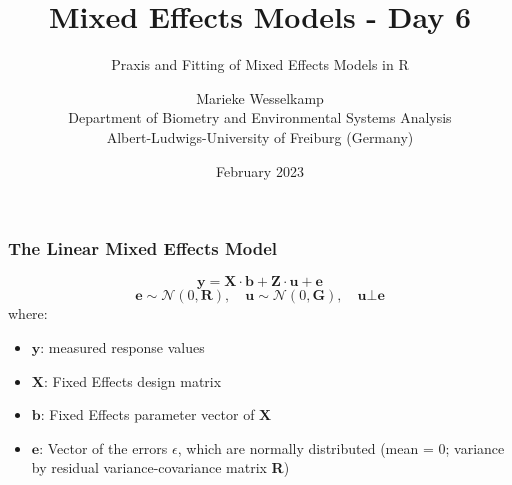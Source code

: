 \documentclass{beamer}
\title{Mixed Effects Models - Day 6}
\subtitle{Praxis and Fitting of Mixed Effects Models in R}
\author{Marieke Wesselkamp\\Department of Biometry and Environmental Systems Analysis\\Albert-Ludwigs-University of Freiburg (Germany)}
\date{February 2023}
\begin{document}
\frame{\titlepage}

\begin{frame}
    \frametitle{The Linear Mixed Effects Model}
    \[
    \mathbf{y} = \mathbf{X} \cdot \mathbf{b} + \mathbf{Z} \cdot \mathbf{u} + \mathbf{e}
    \]
    \[
    \mathbf{e} \sim \mathcal{N}(0, \mathbf{R}), \quad \mathbf{u} \sim \mathcal{N}(0, \mathbf{G}), \quad \mathbf{u} \bot \mathbf{e}
    \]
    where:
    \begin{itemize}
        \item $\mathbf{y}$: measured response values
        \item $\mathbf{X}$: Fixed Effects design matrix
        \item $\mathbf{b}$: Fixed Effects parameter vector of $\mathbf{X}$
        \item $\mathbf{e}$: Vector of the errors $\epsilon$, which are normally distributed (mean = 0; variance by residual variance-covariance matrix \textbf{R})
    \end{itemize}
\end{frame}
\end{document}
